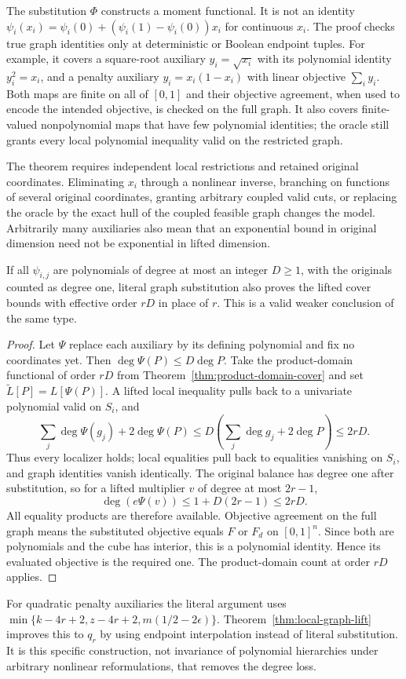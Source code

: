 The substitution $\Phi$ constructs a moment functional. It is not an
identity $\psi_i(x_i)=\psi_i(0)+(\psi_i(1)-\psi_i(0))x_i$ for continuous
$x_i$. The proof checks true graph identities only at deterministic or
Boolean endpoint tuples. For example, it covers a square-root auxiliary
$y_i=\sqrt{x_i}$ with its polynomial identity $y_i^2=x_i$, and a
penalty auxiliary $y_i=x_i(1-x_i)$ with linear objective $\sum_i y_i$.
Both maps are finite on all of $[0,1]$ and their objective agreement, when
used to encode the intended objective, is checked on the full graph.
It also covers finite-valued nonpolynomial maps that have few polynomial
identities; the oracle still grants every local polynomial inequality
valid on the restricted graph.

The theorem requires independent local restrictions and retained original
coordinates. Eliminating $x_i$ through a nonlinear inverse, branching on
functions of several original coordinates, granting arbitrary coupled
valid cuts, or replacing the oracle by the exact hull of the coupled
feasible graph changes the model. Arbitrarily many auxiliaries also mean
that an exponential bound in original dimension need not be exponential
in lifted dimension.

\begin{proposition}
\label{prop:literal-lift}
If all $\psi_{i,j}$ are polynomials of degree at most an integer $D\ge1$,
with the originals counted as degree one, literal graph substitution
also proves the lifted cover bounds with effective order $rD$ in place
of $r$. This is a valid weaker conclusion of the same type.
\end{proposition}
\begin{proof}
Let $\Psi$ replace each auxiliary by its defining polynomial and fix
no coordinates yet. Then $\deg\Psi(P)\le D\deg P$.
Take the product-domain functional of order $rD$ from
Theorem~\ref{thm:product-domain-cover} and set $\widetilde L[P]=L[\Psi(P)]$.
A lifted local inequality pulls back to a univariate polynomial valid on
$S_i$, and
\[
 \sum_j\deg\Psi(g_j)+2\deg\Psi(P)
 \le D\left(\sum_j\deg g_j+2\deg P\right)\le2rD.
\]
Thus every localizer holds; local equalities pull back to equalities
vanishing on $S_i$, and graph identities vanish identically.
The original balance has degree one after substitution, so for a lifted
multiplier $v$ of degree at most $2r-1$,
\[
 \deg(e\Psi(v))\le1+D(2r-1)\le2rD.
\]
All equality products are therefore available. Objective agreement on
the full graph means the substituted objective equals $F$ or $F_d$
on $[0,1]^n$. Since both are polynomials and the cube has interior, this
is a polynomial identity. Hence its evaluated objective is the required
one. The product-domain count at order $rD$ applies.
\end{proof}
For quadratic penalty auxiliaries the literal argument uses
$\min\{k-4r+2,z-4r+2,m(1/2-2\epsilon)\}$.
Theorem~\ref{thm:local-graph-lift} improves this to $q_r$ by using
endpoint interpolation instead of literal substitution. It is this
specific construction, not invariance of polynomial hierarchies under
arbitrary nonlinear reformulations, that removes the degree loss.
